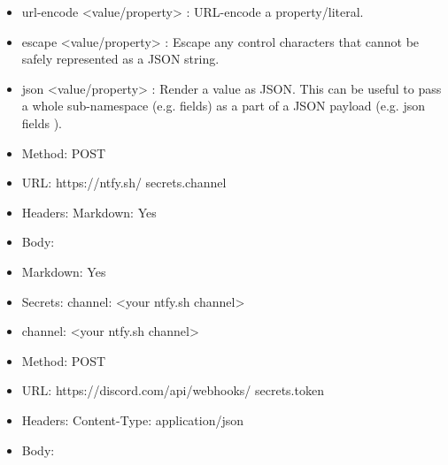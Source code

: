 \begin{itemize}[leftmargin=2cm]

	\item {{ url-encode <value/property> }}: URL-encode a property/literal.

	\item {{ escape <value/property> }}: Escape any control characters that cannot be safely represented as a JSON string.

	\item {{ json <value/property> }}: Render a value as JSON. This can be useful to pass a whole sub-namespace (e.g. fields) as a part of a JSON payload (e.g. {{ json fields }}).

\end{itemize}

\begin{itemize}[leftmargin=2cm]

	\item Method: POST

	\item URL: https://ntfy.sh/{{ secrets.channel }}

	\item Headers: Markdown: Yes

	\item Body:

\end{itemize}

\begin{itemize}[leftmargin=2cm]

	\item Markdown: Yes

\end{itemize}

\begin{itemize}[leftmargin=2cm]

	\item Secrets: channel: <your ntfy.sh channel>

\end{itemize}

\begin{itemize}[leftmargin=2cm]

	\item channel: <your ntfy.sh channel>

\end{itemize}

\begin{itemize}[leftmargin=2cm]

	\item Method: POST

	\item URL: https://discord.com/api/webhooks/{{ secrets.token }}

	\item Headers: Content-Type: application/json

	\item Body:

\end{itemize}

